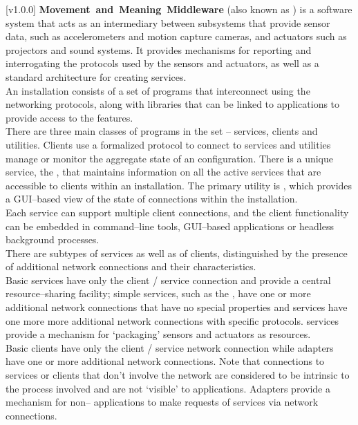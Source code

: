 [v1.0.0]
\textbf{Movement~and~Meaning~Middleware} (also known as \mplusm{}) is a software system
that acts as an intermediary between subsystems that provide sensor data, such as
accelerometers and motion capture cameras, and actuators such as projectors and sound
systems.
It provides mechanisms for reporting and interrogating the protocols used by the sensors
and actuators, as well as a standard architecture for creating services.\\

An \mplusm{} installation consists of a set of programs that interconnect using the
 networking
protocols, along with libraries that can be linked to applications to provide access to
the \mplusm{} features.\\

There are three main classes of programs in the set -- services, clients and utilities.
Clients use a formalized protocol to connect to services and utilities manage or monitor
the aggregate state of an \mplusm{} configuration.
There is a unique service, the , that
maintains information on all the active services that are accessible to clients within an
\mplusm{} installation. The primary utility is
, which provides a GUI--based view of the
state of connections within the installation.\\

Each service can support multiple client connections, and the client functionality can be
embedded in command--line tools, GUI--based applications or headless background
processes.\\

There are subtypes of services as well as of clients, distinguished by the presence of
additional \yarp{} network connections and their characteristics.\\

Basic services have only the client / service \yarp{} connection and provide a central
resource--sharing facility; simple services, such as the
, have one or more additional \yarp{}
network connections that have no special properties and  services have one
more more additional \yarp{} network connections with specific protocols.
 services provide a mechanism for `packaging' sensors and actuators as
\mplusm{} resources.\\

Basic clients have only the client / service \yarp{} network connection while adapters
have one or more additional \yarp{} network connections. Note that connections to services
or clients that don't involve the \yarp{} network are considered to be intrinsic to the
process involved and are not `visible' to \mplusm{} applications. Adapters provide a
mechanism for non--\mplusm{} applications to make requests of \mplusm{} services via
\yarp{} network connections.
\primaryEnd{}
